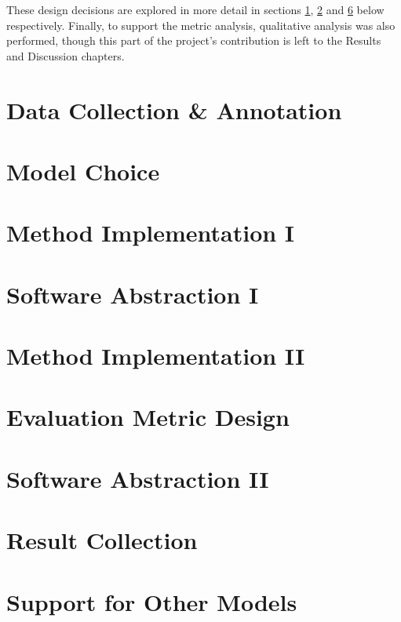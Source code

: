 \documentclass[main]{subfiles}
\begin{document}
These design decisions are explored in more detail in sections \ref{sec:data}, \ref{sec:model} and \ref{sec:metric} below respectively. Finally, to support the metric analysis, qualitative analysis was also performed, though this part of the project's contribution is left to the Results and Discussion chapters.


\section{Data Collection \& Annotation} \label{sec:data}





\newpage
\section{Model Choice} \label{sec:model}

\newpage
\section{Method Implementation I}

\newpage
\section{Software Abstraction I}

\newpage
\section{Method Implementation II}

\newpage
\section{Evaluation Metric Design} \label{sec:metric}


\newpage
\section{Software Abstraction II}


\newpage
\section{Result Collection}


\newpage
\section{Support for Other Models}
\end{document}
